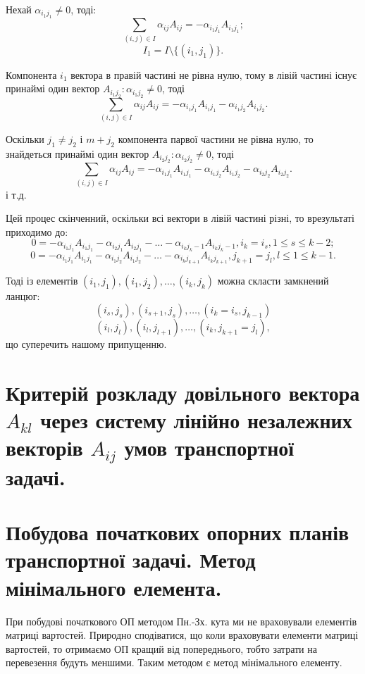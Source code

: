 \documentclass[12pt,a4paper]{article}
\begin{document}
Нехай $\alpha_{{i_1}{j_1}} \neq 0$, тоді: 
$$\sum_{(i,j) \in I}\alpha_{ij}A_{ij} = -\alpha_{{i_1}{j_1}}A_{{i_1}{j_1}};$$
$$I_1 = I\setminus\{(i_1,j_1)\}.$$

Компонента $i_1$ вектора в правій частині не рівна нулю, тому в лівій частині існує принаймі один вектор $A_{{i_1}{j_2}}: \alpha_{{i_1}{j_2}}\neq0$, тоді 
$$\sum_{(i,j){\in}I}\alpha_{ij}A_{ij} = -\alpha_{{i_1}{j_1}}A_{{i_1}{j_1}}-\alpha_{{i_1}{j_2}}A_{{i_1}{j_2}}.$$

Оскільки $j_1 \neq j_2$ і $m + j_2$ компонента парвої частини не рівна нулю, то знайдеться принаймі один вектор $A_{{i_2}{j_2}}: \alpha_{{i_2}{j_2}} \neq 0$, тоді $$\sum_{(i,j) \in I}\alpha_{ij}A_{ij} = -\alpha_{{i_1}{j_1}}A_{{i_1}{j_1}}-\alpha_{{i_1}{j_2}}A_{{i_1}{j_2}}-\alpha_{{i_2}{j_2}}A_{{i_2}{j_2}}.$$
і т.д.

Цей процес скінченний, оскільки всі вектори в лівій частині різні, то врезультаті приходимо до:
$$0 = -\alpha_{{i_1}{j_1}}A_{{i_1}{j_1}}-\alpha_{{i_2}{j_1}}A_{{i_2}{j_1}}-\dots-\alpha_{{i_k}{j_k-1}}A_{{i_k}{j_k-1}}, i_k=i_s, 1 \leq s \leq k-2;$$
$$0 = -\alpha_{{i_1}{j_1}}A_{{i_1}{j_1}}-\alpha_{{i_1}{j_2}}A_{{i_1}{j_2}}-\dots-\alpha_{{i_k}{j_{k+1}}}A_{{i_k}{j_{k+1}}}, j_{k+1}=j_l, l \leq 1 \leq k-1.$$

Тоді із елементів $(i_1,j_1), (i_1,j_2), \dots, (i_k,j_k)$ можна скласти замкнений ланцюг:
$$(i_s,j_s), (i_{s+1},j_s), \dots, (i_k = i_s, j_{k-1})$$
$$(i_l,j_l), (i_l,j_{l+1}), \dots, (i_k, j_{k+1} = j_l),$$
що суперечить нашому припущенню.

\clearpage

\section{Критерій розкладу довільного вектора $A_{kl}$ через систему лінійно незалежних векторів $A_{ij}$ умов транспортної задачі.}

\clearpage

\section{Побудова початкових опорних планів транспортної задачі. Метод мінімального елемента.}

При побудові початкового ОП методом Пн.-Зх. кута ми не враховували елементів матриці вартостей. Природно сподіватися, що коли враховувати елементи матриці вартостей, то отримаємо ОП кращий від попереднього, тобто затрати на перевезення будуть меншими. Таким методом є метод мінімального елементу.
\end{document}
